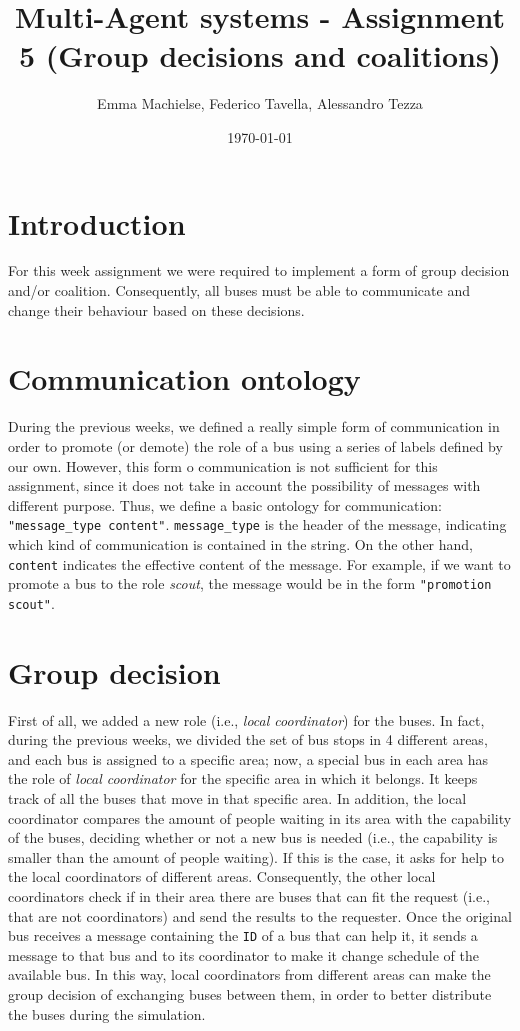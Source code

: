 \documentclass[a4paper]{article}
\title{Multi-Agent systems - Assignment 5 (Group decisions and coalitions)}
\author{Emma Machielse, Federico Tavella, Alessandro Tezza}
\date{\today}
\begin{document}
\maketitle

\section{Introduction}

For this week assignment we were required to implement a form of group decision and/or coalition. Consequently, all buses must be able to communicate and change their behaviour based on these decisions.

\section{Communication ontology}

During the previous weeks, we defined a really simple form of communication in order to promote (or demote) the role of a bus using a series of labels defined by our own. However, this form o communication is not sufficient for this assignment, since it does not take in account the possibility of messages with different purpose. Thus, we define a basic ontology for communication: \texttt{"message\_type content"}. \texttt{message\_type} is the header of the message, indicating which kind of communication is contained in the string. On the other hand, \texttt{content} indicates the effective content of the message. For example, if we want to promote a bus to the role \textit{scout}, the message would be in the form \texttt{"promotion scout"}.

\section{Group decision}

First of all, we added a new role (i.e., \textit{local coordinator}) for the buses. In fact, during the previous weeks, we divided the set of bus stops in 4 different areas, and each bus is assigned to a specific area; now, a special bus in each area has the role of \textit{local coordinator} for the specific area in which it belongs. It keeps track of all the buses that move in that specific area. In addition, the local coordinator compares the amount of people waiting in its area with the capability of the buses, deciding whether or not a new bus is needed (i.e., the capability is smaller than the amount of people waiting). If this is the case, it asks for help to the local coordinators of different areas. Consequently, the other local coordinators check if in their area there are buses that can fit the request (i.e., that are not coordinators) and send the results to the requester. Once the original bus receives a message containing the \texttt{ID} of a bus that can help it, it sends a message to that bus and to its coordinator to make it change schedule of the available bus. In this way, local coordinators from different areas can make the group decision of exchanging buses between them, in order to better distribute the buses during the simulation.
\end{document}
